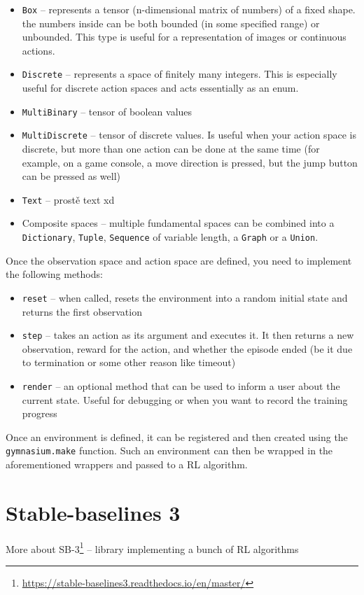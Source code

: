 \documentclass[
  digital,     %
  oneside,     %
  nosansbold,  %
  nocolorbold, %
  lof,         %
  lot,         %
]{fithesis4}
\begin{document}
\begin{itemize}
    \item \verb|Box| -- represents a tensor (n-dimensional matrix of numbers) of a fixed shape. the numbers inside can be both bounded (in some specified range) or unbounded. This type is useful for a representation of images or continuous actions.
    \item \verb|Discrete| -- represents a space of finitely many integers. This is especially useful for discrete action spaces and acts essentially as an enum.
    \item \verb|MultiBinary| -- tensor of boolean values
    \item \verb|MultiDiscrete| -- tensor of discrete values. Is useful when your action space is discrete, but more than one action can be done at the same time (for example, on a game console, a move direction is pressed, but the jump button can be pressed as well)
    \item \verb|Text| -- prostě text xd
    \item Composite spaces -- multiple fundamental spaces can be combined into a \verb|Dictionary|, \verb|Tuple|, \verb|Sequence| of variable length, a \verb|Graph| or a \verb|Union|.
\end{itemize}

Once the observation space and action space are defined, you need to implement the following methods:

\begin{itemize}
    \item \verb|reset| -- when called, resets the environment into a random initial state and returns the first observation
    \item \verb|step| -- takes an action as its argument and executes it. It then returns a new observation, reward for the action, and whether the episode ended (be it due to termination or some other reason like timeout)
    \item \verb|render| -- an optional method that can be used to inform a user about the current state. Useful for debugging or when you want to record the training progress
\end{itemize}

Once an environment is defined, it can be registered and then created using the \verb|gymnasium.make| function. Such an environment can then be wrapped in the aforementioned wrappers and passed to a RL algorithm.

\section{Stable-baselines 3}
More about SB-3\footnote{\url{https://stable-baselines3.readthedocs.io/en/master/}} -- library implementing a bunch of RL algorithms
\end{document}
